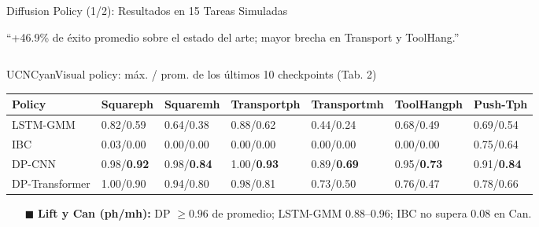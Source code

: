 \documentclass[aspectratio=169,10pt,xcolor={dvipsnames,table}]{beamer}
\newcommand{\BannerFont}{\fontsize{7.5}{9.2}\selectfont\bfseries}       %
\newcommand{\BannerArc}{1.5pt}             %
\newcommand{\BannerRule}{0.5pt}            %
\newcommand{\BannerLeftRule}{2.5pt}        %
\newcommand{\CardHeightTall}{46mm}         %
\newcommand{\BannerCentral}[2][UCNCyan]{%
  \begin{tcolorbox}[
    enhanced,
    colback=#1!10,
    colframe=#1,
    boxrule=\BannerRule,
    leftrule=\BannerLeftRule,
    arc=\BannerArc,
    top=0.35mm, bottom=0.35mm, left=2mm, right=2mm
  ]
    {\BannerFont\raggedright\textcolor{UCNBlue}{#2}\par}
  \end{tcolorbox}%
  \vspace{-2.5mm}%
}
\newcommand{\BannerRef}[1]{{\mdseries\fontsize{5}{6}\selectfont\textcolor{TextDark!65}{\cite{#1}}}} %
\newcommand{\TabFont}{\fontsize{5.3}{6.4}\selectfont}                    %
\begin{document}
\begin{frame}{Diffusion Policy (1/2): Resultados en 15 Tareas Simuladas}
  \BannerCentral[UCNCyan]{``+46.9\% de éxito promedio sobre el estado del arte; mayor brecha en Transport y ToolHang.'' \BannerRef{chi2025diffusion}}
  \vspace{0.8mm}
  \begin{columns}[T, onlytextwidth]
    \begin{column}{0.585\textwidth}
      \begin{Card}[height=\CardHeightTall]{UCNCyan}{Visual policy: máx. / prom. de los últimos 10 checkpoints (Tab. 2)}
        {\TabFont
        \setlength{\tabcolsep}{1.4pt}
        \renewcommand{\arraystretch}{1.1}
        \begin{tabular}{@{}L{15mm} *{6}{C{10.2mm}}@{}}
          \toprule
          \textbf{Policy} & \textbf{Square}\newline ph & \textbf{Square}\newline mh & \textbf{Transport}\newline ph & \textbf{Transport}\newline mh & \textbf{ToolHang}\newline ph & \textbf{Push-T}\newline ph \\
          \midrule
          LSTM-GMM & 0.82/0.59 & 0.64/0.38 & 0.88/0.62 & 0.44/0.24 & 0.68/0.49 & 0.69/0.54 \\
          IBC & 0.03/0.00 & 0.00/0.00 & 0.00/0.00 & 0.00/0.00 & 0.00/0.00 & 0.75/0.64 \\
           DP-CNN & 0.98/\textbf{0.92} & 0.98/\textbf{0.84} & 1.00/\textbf{0.93} & 0.89/\textbf{0.69} & 0.95/\textbf{0.73} & 0.91/\textbf{0.84} \\
          DP-Transformer & 1.00/0.90 & 0.94/0.80 & 0.98/0.81 & 0.73/0.50 & 0.76/0.47 & 0.78/0.66 \\
          \bottomrule
        \end{tabular}\par
        \vspace{1.2mm}
        \begin{itemize}\setlength{\itemsep}{0.8pt}
          \item[\textcolor{UCNCyan}{$\blacksquare$}] \textbf{Lift y Can (ph/mh):} DP $\geq 0.96$ de promedio; LSTM-GMM 0.88--0.96; IBC no supera 0.08 en Can.

\end{itemize}}
\end{Card}
\end{column}
\end{columns}
\end{frame}
\end{document}
